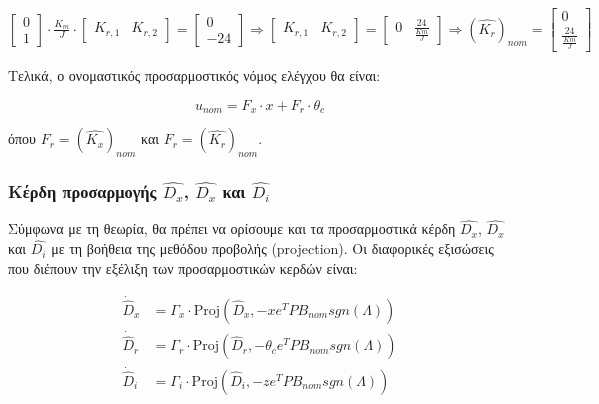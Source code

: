\documentclass{article}
\begin{document}
    \hfill\break
    \begin{math}
        \begin{bmatrix}
            0 \\ 
            1    
        \end{bmatrix} \cdot \frac{K_m}{J} \cdot 
        \begin{bmatrix}
            K_{r,1} & K_{r,2}
        \end{bmatrix} = 
        \begin{bmatrix}
              0 \\
            -24
        \end{bmatrix} \Rightarrow
        \begin{bmatrix}
            K_{r,1} & K_{r,2}
        \end{bmatrix} =
        \begin{bmatrix}
            0 & \frac{24}{\frac{Km}{J}}
        \end{bmatrix} \Rightarrow
        (\hat{K_r})_{nom} =
        \begin{bmatrix}
            0 \\
            \frac{24}{\frac{Km}{J}}
        \end{bmatrix}
    \end{math}
    
    \hfill\break
    Τελικά, ο ονομαστικός προσαρμοστικός νόμος ελέγχου θα είναι:
    
    \begin{equation}
        u_{nom} = F_x \cdot x + F_r \cdot \theta_c
    \end{equation}
    
    \noindent
    όπου \(F_r = (\hat{K_x})_{nom}\) και \(F_r = (\hat{K_r})_{nom}\).
    
    \subsubsection{Kέρδη προσαρμογής \(\hat{D_x}\), \(\hat{D_x}\) και \(\hat{D_i}\)}
    Σύμφωνα με τη θεωρία, θα πρέπει να ορίσουμε και τα προσαρμοστικά κέρδη \(\hat{D_x}\), \(\hat{D_x}\) και \(\hat{D_i}\) με τη βοήθεια της μεθόδου προβολής (projection). Οι διαφορικές εξισώσεις που διέπουν την εξέλιξη των προσαρμοστικών κερδών είναι:
    
    \begin{equation*}
        \begin{aligned}
        \dot{\hat{D}}_x &= \Gamma_x \cdot \text{Proj} \left( \hat{D}_x, -x e^T P B_{nom} sgn(\Lambda)\right) \\
        \dot{\hat{D}}_r &= \Gamma_r \cdot \text{Proj} \left( \hat{D}_r, -\theta_c e^T P B_{nom} sgn(\Lambda)\right) \\
        \dot{\hat{D}}_i &= \Gamma_i \cdot \text{Proj} \left( \hat{D}_i, -z e^T P B_{nom} sgn(\Lambda)\right)
        \end{aligned}
    \end{equation*}
    
\end{document}
